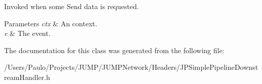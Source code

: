 Invoked when some Send data is requested. 


\begin{DoxyParams}{Parameters}
{\em ctx} & An context. \\
\hline
{\em e} & The event. \\
\hline
\end{DoxyParams}


The documentation for this class was generated from the following file:\begin{DoxyCompactItemize}
\item 
/Users/Paulo/Projects/JUMP/JUMPNetwork/Headers/JPSimplePipelineDownstreamHandler.h\end{DoxyCompactItemize}
